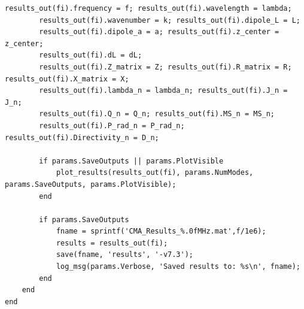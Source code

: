 \documentclass[11pt, a4paper]{report}
\begin{document}
\begin{lstlisting}[caption={The core MoM/CMA solver for a thin-wire dipole.}, label={lst:main_cma}]
        results_out(fi).frequency = f; results_out(fi).wavelength = lambda;
        results_out(fi).wavenumber = k; results_out(fi).dipole_L = L;
        results_out(fi).dipole_a = a; results_out(fi).z_center = z_center;
        results_out(fi).dL = dL;
        results_out(fi).Z_matrix = Z; results_out(fi).R_matrix = R; results_out(fi).X_matrix = X;
        results_out(fi).lambda_n = lambda_n; results_out(fi).J_n = J_n;
        results_out(fi).Q_n = Q_n; results_out(fi).MS_n = MS_n;
        results_out(fi).P_rad_n = P_rad_n; results_out(fi).Directivity_n = D_n;
        
        if params.SaveOutputs || params.PlotVisible
            plot_results(results_out(fi), params.NumModes, params.SaveOutputs, params.PlotVisible);
        end
        
        if params.SaveOutputs
            fname = sprintf('CMA_Results_%.0fMHz.mat',f/1e6);
            results = results_out(fi);
            save(fname, 'results', '-v7.3');
            log_msg(params.Verbose, 'Saved results to: %s\n', fname);
        end
    end
end
\end{lstlisting}
\end{document}
